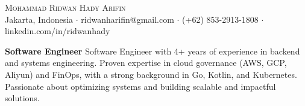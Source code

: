 \documentclass[a4paper]{article}
\begin{document}
\vspace*{-40pt}

\vspace*{-10pt}
\begin{center}
	{\Huge \scshape{Mohammad Ridwan Hady Arifin}}\\
	Jakarta, Indonesia $\cdot$ ridwanharifin@gmail.com $\cdot$ (+62) 853-2913-1808 $\cdot$ linkedin.com/in/ridwanhady\\
\end{center}

\textbf{Software Engineer}
\newline
Software Engineer with 4+ years of experience in backend and systems engineering. Proven expertise in cloud governance (AWS, GCP, Aliyun) and FinOps, with a strong background in Go, Kotlin, and Kubernetes. Passionate about optimizing systems and building scalable and impactful solutions.
\vspace{2mm}

\vspace{1mm}
\end{document}
